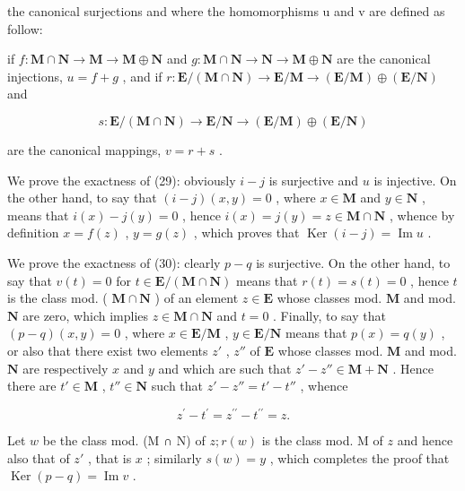 the canonical surjections and where the homomorphisms u and v are defined as follow:

if \(f: \mathbf{M} \cap \mathbf{N} \to \mathbf{M} \to \mathbf{M} \oplus \mathbf{N}\) and \(g: \mathbf{M} \cap \mathbf{N} \to \mathbf{N} \to \mathbf{M} \oplus \mathbf{N}\) are the canonical injections, \(u = f + g\) , and if \(r: \mathbf{E}/(\mathbf{M} \cap \mathbf{N}) \to \mathbf{E}/\mathbf{M} \to (\mathbf{E}/\mathbf{M}) \oplus (\mathbf{E}/\mathbf{N})\) and

\[
s: \mathbf {E} / (\mathbf {M} \cap \mathbf {N}) \rightarrow \mathbf {E} / \mathbf {N} \rightarrow (\mathbf {E} / \mathbf {M}) \oplus (\mathbf {E} / \mathbf {N})
\]

are the canonical mappings, \(v = r + s\) .

We prove the exactness of (29): obviously \(i-j\) is surjective and \(u\) is injective. On the other hand, to say that \((i-j)(x,y)=0\) , where \(x\in\mathbf{M}\) and \(y\in\mathbf{N}\) , means that \(i(x)-j(y)=0\) , hence \(i(x)=j(y)=z\in\mathbf{M}\cap\mathbf{N}\) , whence by definition \(x=f(z)\) , \(y=g(z)\) , which proves that \(\operatorname{Ker}(i-j)=\operatorname{Im}u\) .

We prove the exactness of (30): clearly \(p - q\) is surjective. On the other hand, to say that \(v(t) = 0\) for \(t \in \mathbf{E} / (\mathbf{M} \cap \mathbf{N})\) means that \(r(t) = s(t) = 0\) , hence \(t\) is the class mod. ( \(\mathbf{M} \cap \mathbf{N}\) ) of an element \(z \in \mathbf{E}\) whose classes mod. \(\mathbf{M}\) and mod. \(\mathbf{N}\) are zero, which implies \(z \in \mathbf{M} \cap \mathbf{N}\) and \(t = 0\) . Finally, to say that \((p - q)(x, y) = 0\) , where \(x \in \mathbf{E} / \mathbf{M}\) , \(y \in \mathbf{E} / \mathbf{N}\) means that \(p(x) = q(y)\) , or also that there exist two elements \(z'\) , \(z''\) of \(\mathbf{E}\) whose classes mod. \(\mathbf{M}\) and mod. \(\mathbf{N}\) are respectively \(x\) and \(y\) and which are such that \(z' - z'' \in \mathbf{M} + \mathbf{N}\) . Hence there are \(t' \in \mathbf{M}\) , \(t'' \in \mathbf{N}\) such that \(z' - z'' = t' - t''\) , whence

\[
z ^ {\prime} - t ^ {\prime} = z ^ {\prime \prime} - t ^ {\prime \prime} = z.
\]

Let \(w\) be the class mod. (M ∩ N) of \(z; r(w)\) is the class mod. M of \(z\) and hence also that of \(z'\) , that is \(x\) ; similarly \(s(w) = y\) , which completes the proof that \(\operatorname{Ker}(p - q) = \operatorname{Im} v\) .


